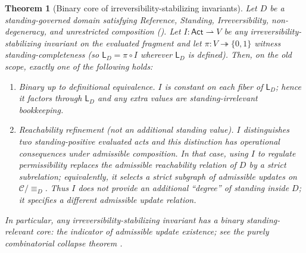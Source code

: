\documentclass[11pt]{article}
\newtheorem{theorem}{Theorem}[section]
\theoremstyle{definition}
\newcommand{\Act}{\mathsf{Act}}
\newcommand{\Stand}{\mathsf{L}}
\newcommand{\ppar}{\rightharpoonup} %
\begin{document}
\begin{theorem}[Binary core of irreversibility-stabilizing invariants]
\label{thm:binary-invariant-necessity}
Let $D$ be a standing-governed domain satisfying Reference, Standing, Irreversibility, non-degeneracy,
and unrestricted composition ().
Let $I:\Act\ppar V$ be any irreversibility-stabilizing invariant on the evaluated fragment and let
$\pi:V\twoheadrightarrow\{0,1\}$ witness standing-completeness (so $\Stand_D=\pi\circ I$ wherever $\Stand_D$ is defined).
Then, on the old scope, exactly one of the following holds:
\begin{enumerate}[label=\textbf{(B\arabic*)}, leftmargin=2.6em]
\item \emph{Binary up to definitional equivalence.}
$I$ is constant on each fiber of $\Stand_D$; hence it factors through $\Stand_D$ and any extra values are
standing-irrelevant bookkeeping.
\item \emph{Reachability refinement (not an additional standing value).}
$I$ distinguishes two standing-positive evaluated acts and this distinction has operational consequences under admissible
composition.
In that case, using $I$ to regulate permissibility replaces the admissible reachability relation of $D$
by a strict subrelation; equivalently, it selects a strict subgraph of admissible updates on $\mathcal{C}/\equiv_D$.
Thus $I$ does not provide an additional ``degree'' of standing inside $D$; it specifies a different admissible update
relation.
\end{enumerate}
In particular, any irreversibility-stabilizing invariant has a binary standing-relevant core: the indicator of admissible
update existence; see the purely combinatorial collapse theorem .
\end{theorem}
\end{document}
